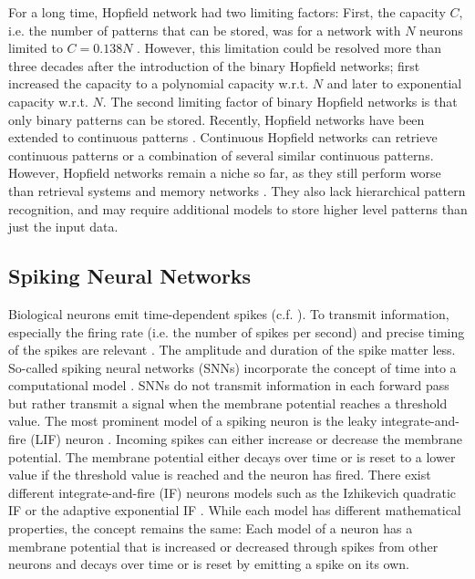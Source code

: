 For a long time, Hopfield network had two limiting factors: First, the capacity $C$, i.e. the number of patterns that can be stored, was for a network with $N$ neurons limited to $C=0.138N$ .
However, this limitation could be resolved more than three decades after the introduction of the binary Hopfield networks; 
 first increased the capacity to a polynomial capacity w.r.t. $N$ and  later to exponential capacity w.r.t. $N$.
The second limiting factor of binary Hopfield networks is that only binary patterns can be stored.
Recently, Hopfield networks have been extended to continuous patterns .
Continuous Hopfield networks can retrieve continuous patterns or a combination of several similar continuous patterns.
However, Hopfield networks remain a niche so far, as they still perform worse than retrieval systems \cite{noauthor_information_1997} and memory networks \cite{weston_memory_2015}.
They also lack hierarchical pattern recognition, and may require additional models to store higher level patterns than just the input data.


\subsection{Spiking Neural Networks}
Biological neurons emit time-dependent spikes (c.f. ).
To transmit information, especially the firing rate (i.e. the number of spikes per second) and precise timing of the spikes are relevant .
The amplitude and duration of the spike matter less.
So-called spiking neural networks (SNNs) incorporate the concept of time into a computational model .
SNNs do not transmit information in each forward pass but rather transmit a signal when the membrane potential reaches a threshold value. 
The most prominent model of a spiking neuron is the leaky integrate-and-fire (LIF) neuron .
Incoming spikes can either increase or decrease the membrane potential.
The membrane potential either decays over time or is reset to a lower value if the threshold value is reached and the neuron has fired.
There exist different integrate-and-fire (IF) neurons models such as the Izhikevich quadratic IF  or the adaptive exponential IF .
While each model has different mathematical properties, the concept remains the same: Each model of a neuron has a membrane potential that is increased or decreased through spikes from other neurons and decays over time or is reset by emitting a spike on its own.

